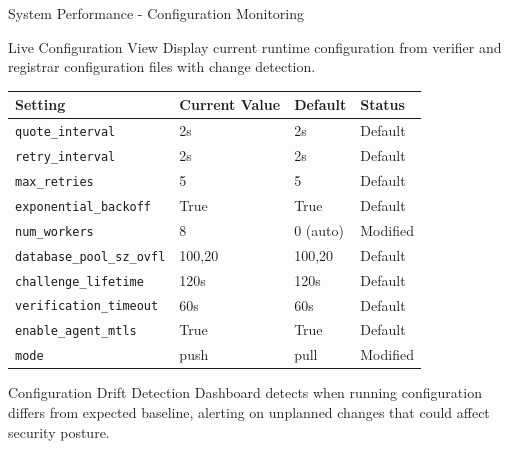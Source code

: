 \begin{frame}{System Performance - Configuration Monitoring}
  \begin{block}{Live Configuration View}
    \scriptsize
    Display current runtime configuration from verifier and registrar
    configuration files with change detection.
  \end{block}

  \vspace{0.1cm}

  \scriptsize
  \begin{center}
    \begin{tabular}{|l|l|l|l|}
      \hline
      \textbf{Setting} & \textbf{Current Value} & \textbf{Default} & \textbf{Status} \\
      \hline
      \hline
      \texttt{quote\_interval} & 2s & 2s & \textcolor{successgreen}{Default} \\
      \hline
      \texttt{retry\_interval} & 2s & 2s & \textcolor{successgreen}{Default} \\
      \hline
      \texttt{max\_retries} & 5 & 5 & \textcolor{successgreen}{Default} \\
      \hline
      \texttt{exponential\_backoff} & True & True & \textcolor{successgreen}{Default} \\
      \hline
      \texttt{num\_workers} & 8 & 0 (auto) & \textcolor{warningyellow}{Modified} \\
      \hline
      \texttt{database\_pool\_sz\_ovfl} & 100,20 & 100,20 & \textcolor{successgreen}{Default} \\
      \hline
      \texttt{challenge\_lifetime} & 120s & 120s & \textcolor{successgreen}{Default} \\
      \hline
      \texttt{verification\_timeout} & 60s & 60s & \textcolor{successgreen}{Default} \\
      \hline
      \texttt{enable\_agent\_mtls} & True & True & \textcolor{successgreen}{Default} \\
      \hline
      \texttt{mode} & push & pull & \textcolor{warningyellow}{Modified} \\
      \hline
    \end{tabular}
  \end{center}

  \vspace{0.2cm}

  \begin{exampleblock}{Configuration Drift Detection}
    \scriptsize
    Dashboard detects when running configuration differs from expected baseline,
    alerting on unplanned changes that could affect security posture.
  \end{exampleblock}
\end{frame}
